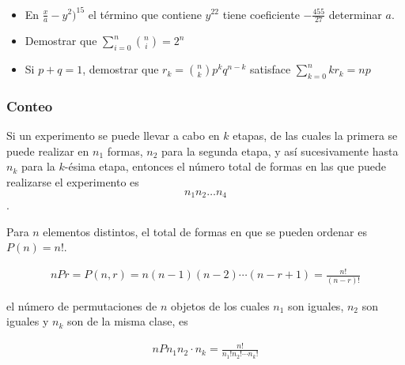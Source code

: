 \begin{Ejer}
\begin{itemize}
\item[xv) ] En $\frac{x}{a}-y^2)^{15}$ el t\'ermino que contiene $y^{22}$ tiene coeficiente $-\frac{455}{27}$ determinar $a$.

\item[ixv) ] Demostrar que $\sum_{i=0}^{n}\binom{n}{i}=2^n$

\item[xvii) ] Si $p+q=1$, demostrar que $r_k=\binom{n}{k}p^kq^{n-k}$ satisface $\sum_{k=0}^{n}kr_k=np$

\end{itemize}

\end{Ejer}
\subsubsection*{Conteo}

\begin{Def}
Si un experimento se puede llevar a cabo en $k$ etapas, de las cuales la primera se puede realizar en $n_1$ formas,  $n_2$ para la segunda etapa, y as\'i sucesivamente hasta $n_k$ para la $k$-\'esima etapa,  entonces el n\'umero total de formas en las que puede realizarse el experimento es $$n_{1}n_{2}\dots n_{4}$$.

\end{Def}


\begin{Def}[Permutaciones]
Para $n$ elementos distintos,  el total de formas 	en que se pueden ordenar es $P(n)=n!$.

\end{Def}


\begin{Teo}
\begin{eqnarray}
nPr=P\left(n,r\right)=n\left(n-1\right)\left(n-2\right)\cdots\left(n-r+1\right)=\frac{n!}{\left(n-r\right)!}
\end{eqnarray}
\end{Teo}

\begin{Teo}
el n\'umero de permutaciones de $n$ objetos de los cuales $n_{1}$ son iguales, $n_{2}$ son iguales y $n_{k}$ son de la misma clase, es

\begin{eqnarray}
nPn_{1}n_{2}\cdot n_{k}=\frac{n!}{n_{1}!n_{2}!\cdots n_{k}!}
\end{eqnarray}

\end{Teo}


